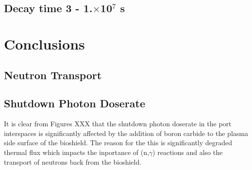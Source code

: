 \documentclass[12pt]{article}
\begin{document}
\subsection{Decay time 3 - 1.$\times$10$^7$ s}

\section{Conclusions}
\subsection{Neutron Transport}
\subsection{Shutdown Photon Doserate}
It is clear from Figures XXX that the shutdown photon doserate in the port interspaces is significantly affected by the addition of boron carbide to the plasma side surface of the bioshield. The reason for the this is significantly degraded thermal flux which impacts the inportance of (n,$\gamma$) reactions and also the transport of neutrons back from the bioshield. 



\end{document}

